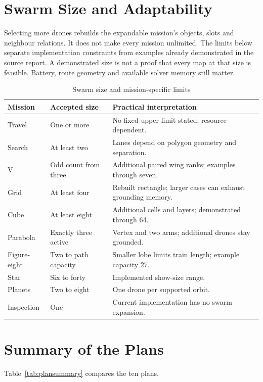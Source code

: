 \documentclass[11pt,a4paper,oneside]{report}
\begin{document}
\section{Swarm Size and Adaptability}
Selecting more drones rebuilds the expandable mission's objects, slots and
neighbour relations. It does not make every mission unlimited. The limits below
separate implementation constraints from examples already demonstrated in the
source report. A demonstrated size is not a proof that every map at that size
is feasible. Battery, route geometry and available solver memory still matter.
\begin{table}[H]
\caption[Swarm size and mission limits]{Swarm size and mission-specific limits}
\small
\begin{tabularx}{\textwidth}{@{}P{0.20\textwidth}P{0.28\textwidth}Y@{}}
\toprule
\textbf{Mission} & \textbf{Accepted size} & \textbf{Practical interpretation} \\\midrule
Travel & One or more & No fixed upper limit stated; resource dependent. \\
Search & At least two & Lanes depend on polygon geometry and separation. \\
V & Odd count from three & Additional paired wing ranks; examples through seven. \\
Grid & At least four & Rebuilt rectangle; larger cases can exhaust grounding memory. \\
Cube & At least eight & Additional cells and layers; demonstrated through 64. \\
Parabola & Exactly three active & Vertex and two arms; additional drones stay grounded. \\
Figure-eight & Two to path capacity & Smaller lobe limits train length; example capacity 27. \\
Star & Six to forty & Implemented show-size range. \\
Planets & Two to eight & One drone per supported orbit. \\
Inspection & One & Current implementation has no swarm expansion. \\
\bottomrule
\end{tabularx}
\end{table}

\section{Summary of the Plans}
Table~\ref{tab:plansummary} compares the ten plans.
\end{document}
